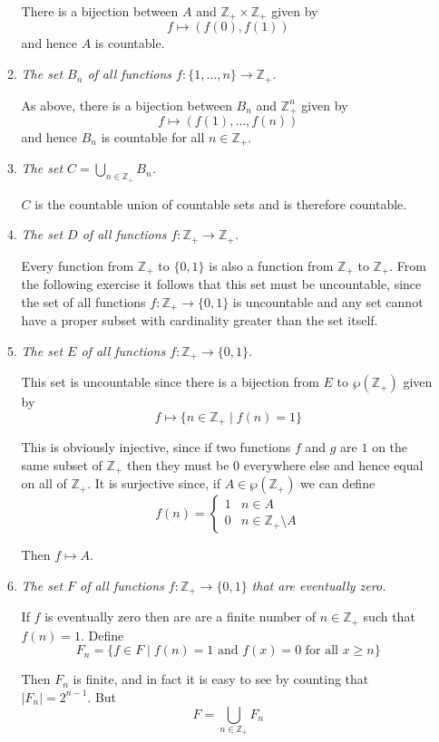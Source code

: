 \documentclass[letterpaper, 11pt]{article}
\newcommand{\powset}[1]{
\wp\left(#1\right)
}
\newcommand{\Z}{\mathbb{Z}}
\begin{document}
\begin{enumerate}
\begin{enumerate}
There is a bijection between $A$ and $\Z_+ \times \Z_+$ given by $$f \mapsto \left(f(0), f(1)\right)$$ and hence $A$ is countable.

\item \emph{The set $B_n$ of all functions $f: \{1,\ldots,n\} \rightarrow \Z_+$.}

As above, there is a bijection between $B_n$ and $\Z_+^n$ given by $$f \mapsto (f(1), \ldots, f(n))$$ and hence $B_n$ is countable for all $n \in \Z_+$.

\item \emph{The set $C = \bigcup_{n \in \Z_+} B_n$.}

$C$ is the countable union of countable sets and is therefore countable.

\item \emph{The set $D$ of all functions $f: \Z_+ \rightarrow \Z_+$.}

Every function from $\Z_+$ to $\{0,1\}$ is also a function from $\Z_+$ to $\Z_+$.  From the following exercise it follows that this set must be uncountable, since the set of all functions $f: \Z_+ \rightarrow \{0,1\}$ is uncountable and any set cannot have a proper subset with cardinality greater than the set itself.

\item \emph{The set $E$ of all functions $f: \Z_+ \rightarrow \{0,1\}$.}

This set is uncountable since there is a bijection from $E$ to $\powset{\Z_+}$ given by $$f \mapsto \{n \in \Z_+ \mid f(n) = 1\}$$

This is obviously injective, since if two functions $f$ and $g$ are $1$ on the same subset of $\Z_+$ then they must be $0$ everywhere else and hence equal on all of $\Z_+$.  It is surjective since, if $A \in \powset{\Z_+}$ we can define
\[
f(n) = \begin{cases} 1 & n \in A \\ 0 & n \in \Z_+ \setminus A \end{cases}
\]

Then $f \mapsto A$.
\item \emph{The set $F$ of all functions $f: \Z_+ \rightarrow \{0,1\}$ that are eventually zero.}

If $f$ is eventually zero then are are a finite number of $n \in \Z_+$ such that $f(n) = 1$.  Define
\[
F_n = \{ f \in F \mid f(n) = 1 \mbox{ and } f(x) = 0 \mbox{ for all } x \geq n \}
\]

Then $F_n$ is finite, and in fact it is easy to see by counting that $|F_n| = 2^{n-1}$.  But
\[
F = \bigcup_{n \in \Z_+} F_n
\]


\end{enumerate}
\end{enumerate}
\end{document}
